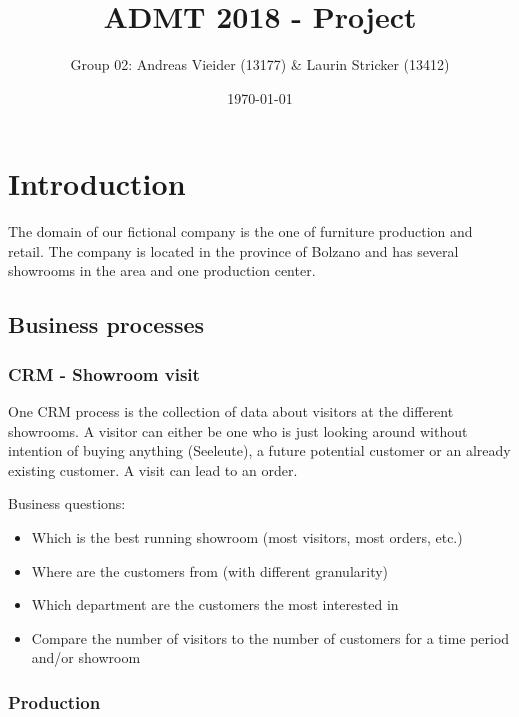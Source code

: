 \documentclass[letterpaper,12pt]{article}
\begin{document}
\title{ADMT 2018 - Project }
\author{Group 02: Andreas Vieider (13177) & Laurin Stricker (13412)}
\date{\today}
\maketitle




\section{Introduction}

The domain of our fictional company is the one of furniture production and retail. The company is located in the province of Bolzano and has several showrooms in the area and one production center.

\subsection{Business processes}

\subsubsection{CRM - Showroom visit}

One CRM process is the collection of data about visitors at the different showrooms. A visitor can either be one who is just looking around without intention of buying anything (Seeleute), a future potential customer or an already existing customer. A visit can lead to an order.

Business questions:
\begin{itemize}
        \item Which is the best running showroom (most visitors, most orders, etc.)
        \item Where are the customers from (with different granularity)
        \item Which department are the customers the most interested in
        \item Compare the number of visitors to the number of customers for a time period and/or showroom
\end{itemize}

\subsubsection{Production}
\end{document}
